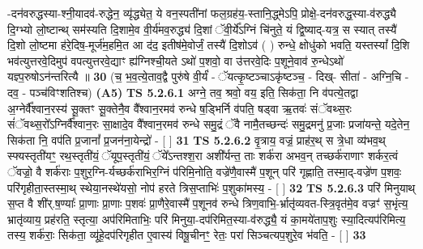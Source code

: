\documentclass[17pt]{extarticle}
\begin{document}
                  -दन॑वरुद्धस्या-श्नी॒यादव॑-रुद्धेन॒ व्यृ॑द्ध्येत॒ ये वन॒स्पती॑नां फल॒ग्रह॑य॒-स्तानि॒द्ध्मेऽपि॒ प्रोक्षे॒-दन॑वरुद्ध॒स्या-व॑रुद्ध्यै दि॒ग्भ्यो लो॒ष्टान्थ् सम॑स्यति दि॒शामे॒व वी॒र्य॑मव॒रुद्ध्य॑ दि॒शां ॅवी॒र्ये᳚ऽग्निं चि॑नुते॒ यं द्वि॒ष्याद्-यत्र॒ स स्यात् तस्यै॑ दि॒शो लो॒ष्टमा ह॑रे॒दिष॒-मूर्ज॑म॒हमि॒त आ द॑द॒ इतीष॑मे॒वोर्जं॒ तस्यै॑ दि॒शोऽव॑ ( ) रुन्धे॒ क्षोधु॑को भवति॒ यस्तस्यां᳚ दि॒शि भव॑त्युत्तरवे॒दिमुप॑ वपत्युत्तरवे॒द्याꣳ ह्य॑ग्निश्ची॒यते ऽथो॑ प॒शवो॒ वा उ॑त्तरवे॒दिः प॒शूने॒वाव॑ रु॒न्धेऽथो॑ यज्ञ्प॒रुषोऽन॑न्तरित्यै ॥ \textbf{  30} \newline
                  \newline
                      (च॒ भ॒व॒त्ये॒ताव॒द्वै पुरु॑षे वी॒र्यं॑ - ॅयत्कृ॒ष्टञ्चाऽकृ॑ष्टञ्च॒ - दिख्- सीता॑ - अग्नि॒चि - दव॒ - पञ्च॑विꣳशतिश्च)  \textbf{(A5)} \newline \newline
                                        \textbf{ TS 5.2.6.1} \newline
                  अग्ने॒ तव॒ श्रवो॒ वय॒ इति॒ सिक॑ता॒ नि व॑पत्ये॒तद्वा अ॒ग्नेर्वै᳚श्वान॒रस्य॑ सू॒क्तꣳ सू॒क्तेनै॒व वै᳚श्वान॒रमव॑ रुन्धे ष॒ड्भिर्नि व॑पति॒ षड्वा ऋ॒तवः॑ संॅवथ्स॒रः सं॑ॅवथ्स॒रो᳚ऽग्निर्वै᳚श्वान॒रः सा॒क्षादे॒व वै᳚श्वान॒रमव॑ रुन्धे समु॒द्रं ॅवै नामै॒तच्छन्दः॑ समु॒द्रमनु॑ प्र॒जाः प्रजा॑यन्ते॒ यदे॒तेन॒ सिक॑ता नि॒ वप॑ति प्र॒जानां᳚ प्र॒जन॑ना॒येन्द्रो॑ - [  ] \textbf{  31} \newline
                  \newline
                                \textbf{ TS 5.2.6.2} \newline
                  वृ॒त्राय॒ वज्रं॒ प्राह॑र॒थ् स त्रे॒धा व्य॑भव॒थ् स्फ्यस्तृती॑यꣳ॒॒ रथ॒स्तृती॑यं॒ ॅयूप॒स्तृती॑यं॒ ॅये᳚ऽन्तश्श॒रा अशी᳚र्यन्त॒ ताः शर्क॑रा अभव॒न् तच्छर्क॑राणाꣳ शर्कर॒त्वं ॅवज्रो॒ वै शर्क॑राः प॒शुर॒ग्नि-र्यच्छर्क॑राभिर॒ग्निं प॑रिमि॒नोति॒ वज्रे॑णै॒वास्मै॑ प॒शून् परि॑ गृह्णाति॒ तस्मा॒द्-वज्रे॑ण प॒शवः॒ परि॑गृहीता॒स्तस्मा॒थ् स्थेया॒नस्थे॑यसो॒ नोप॑ हरते त्रिस॒प्ताभिः॑ प॒शुका॑मस्य॒ - [  ] \textbf{  32} \newline
                  \newline
                                \textbf{ TS 5.2.6.3} \newline
                  परि॑ मिनुयाथ् स॒प्त वै शी॑र्.ष॒ण्याः᳚ प्रा॒णाः प्रा॒णाः प॒शवः॑ प्रा॒णैरे॒वास्मै॑ प॒शूनव॑ रुन्धे त्रिण॒वाभि॒-र्भ्रातृ॑व्यवत-स्त्रि॒वृत॑मे॒व वज्रꣳ॑ स॒भृंत्य॒ भ्रातृ॑व्याय॒ प्रह॑रति॒ स्तृत्या॒ अप॑रिमिताभिः॒ परि॑ मिनुया॒-दप॑रिमित॒स्या-व॑रुद्ध्यै॒ यं का॒मये॑ताप॒शुः स्या॒दित्यप॑रिमित्य॒ तस्य॒ शर्क॑राः॒ सिक॑ता॒ व्यू॑हे॒दप॑रिगृहीत ए॒वास्य॑ विषू॒चीनꣳ॒॒ रेतः॒ परा॑ सिञ्चत्यप॒शुरे॒व भ॑वति॒ - [  ] \textbf{  33} \newline
\end{document}
